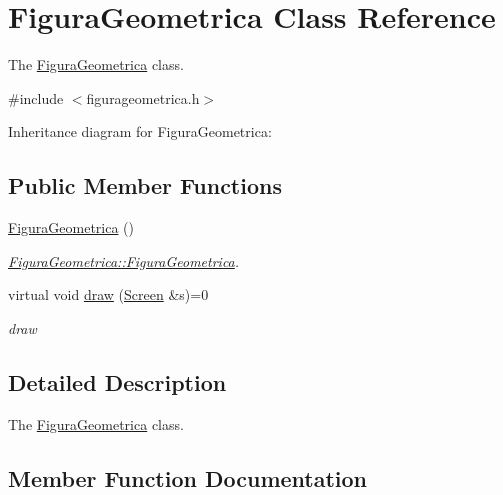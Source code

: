 \hypertarget{classFiguraGeometrica}{}\section{Figura\+Geometrica Class Reference}
\label{classFiguraGeometrica}


The \hyperlink{classFiguraGeometrica}{Figura\+Geometrica} class.  




{\ttfamily \#include $<$figurageometrica.\+h$>$}



Inheritance diagram for Figura\+Geometrica\+:
\subsection*{Public Member Functions}
\begin{DoxyCompactItemize}
\item 
\mbox{\label{classFiguraGeometrica_a81d7c7efaea511e60a15f5a363138dd9}} 
\hyperlink{classFiguraGeometrica_a81d7c7efaea511e60a15f5a363138dd9}{Figura\+Geometrica} ()
\begin{DoxyCompactList}\small\item\em \hyperlink{classFiguraGeometrica_a81d7c7efaea511e60a15f5a363138dd9}{Figura\+Geometrica\+::\+Figura\+Geometrica}. \end{DoxyCompactList}\item 
virtual void \hyperlink{classFiguraGeometrica_a68c63fbb8df93c677d9e8d134bb57f94}{draw} (\hyperlink{classScreen}{Screen} \&s)=0
\begin{DoxyCompactList}\small\item\em draw \end{DoxyCompactList}\end{DoxyCompactItemize}


\subsection{Detailed Description}
The \hyperlink{classFiguraGeometrica}{Figura\+Geometrica} class. 

\subsection{Member Function Documentation}
\mbox{\label{classFiguraGeometrica_a68c63fbb8df93c677d9e8d134bb57f94}} 
